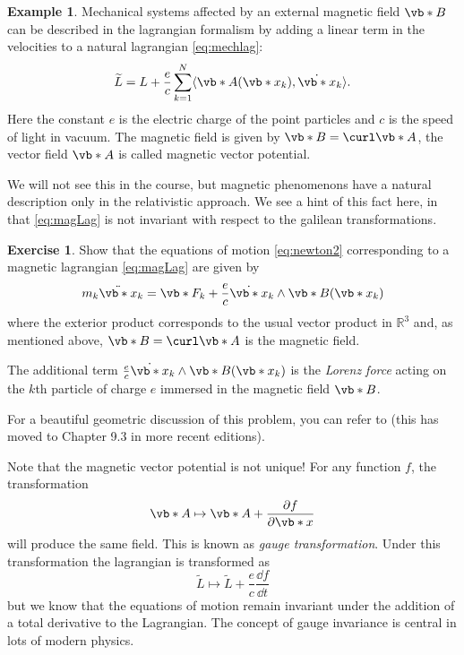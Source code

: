 \documentclass[english,fontsize=11pt,paper=b5]{scrbook}
\theoremstyle{definition}
\newtheorem{example}{Example}[chapter]
\newtheorem{exercise}{Exercise}[chapter]
\begin{document}
    \begin{example}\label{exa:magnetic}
      Mechanical systems affected by an external magnetic field $\vb* B$ can be described in the lagrangian formalism by adding a linear term in the velocities to a natural lagrangian \eqref{eq:mechlag}:
      \begin{equation}\label{eq:magLag}
        \widetilde L = L + \frac ec \sum_{k=1}^N \langle\vb* A(\vb*{x}_k), \dot{\vb*{x}}_k\rangle.
      \end{equation}
      Here the constant $e$ is the electric charge of the point particles and $c$ is the speed of light in vacuum.
      The magnetic field is given by $\vb* B = \curl \vb* A$, the vector field $\vb* A$ is called magnetic vector potential.

      We will not see this in the course, but magnetic phenomenons have a natural description only in the relativistic approach. We see a hint of this fact here, in that \eqref{eq:magLag} is not invariant with respect to the galilean transformations.

      \begin{exercise}\label{exe:magnetic}
        Show that the equations of motion \eqref{eq:newton2} corresponding to a magnetic lagrangian \eqref{eq:magLag} are given by
        \begin{equation}
          m_k \ddot{\vb*{x}}_k = \vb*{F}_k + \frac ec \dot{\vb*{x}}_k \wedge \vb* B(\vb*{x}_k)
        \end{equation}
        where the exterior product corresponds to the usual vector product in $\mathbb{R}^3$ and, as mentioned above, $\vb* B = \curl \vb* A$ is the magnetic field.

        The additional term $\frac ec \dot{\vb*{x}}_k\wedge \vb* B(\vb*{x}_k)$ is the \emph{Lorenz force} acting on the $k$th particle of charge $e$ immersed in the magnetic field $\vb* B$.

        For a beautiful geometric discussion of this problem, you can refer to \cite[Chapter 8.3]{book:amr} (this has moved to Chapter 9.3 in more recent editions).
      \end{exercise}

      Note that the magnetic vector potential is not unique!
      For any function $f$, the transformation
      \begin{equation}
        \vb* A \mapsto \vb* A + \frac{\partial f}{\partial \vb*{x}}
      \end{equation}
      will produce the same field.
      This is known as \emph{gauge transformation}.
      Under this transformation the lagrangian is transformed as
      \begin{equation}
        \widetilde L \mapsto \widetilde L + \frac{e}{c} \frac{\dd f}{\dd t}
      \end{equation}
      but we know that the equations of motion remain invariant under the addition of a total derivative to the Lagrangian.
      The concept of gauge invariance is central in lots of modern physics.
    \end{example}
\end{document}
